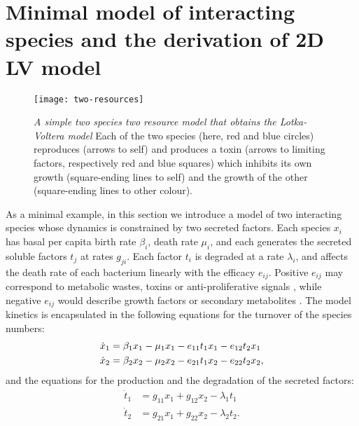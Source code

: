 \section{Minimal model of interacting species and the derivation of 2D LV model} %
\begin{figure}[ht]
	\centering
	\texttt{[image: two-resources]}
	\caption{\emph{A simple two species two resource model that obtains the Lotka-Voltera model} Each of the two species (here, red and blue circles) reproduces (arrows to self) and produces a toxin (arrows to limiting factors, respectively red and blue squares) which inhibits its own growth (square-ending lines to self) and the growth of the other (square-ending lines to other colour). }
\end{figure}%

As a minimal example, in this section we introduce a model of two interacting species whose dynamics is constrained by two secreted factors. Each species $x_i$ has basal per capita birth rate $\beta_i$, death rate $\mu_i$, and each generates the secreted soluble factors $t_j$ at rates $g_{ji}$. Each factor $t_i$ is degraded at a rate $\lambda_i$, and affects the death rate of each bacterium linearly with the efficacy $e_{ij}$. Positive $e_{ij}$ may correspond to metabolic wastes, toxins or anti-proliferative signals \cite{Jacob1989,Maplestone1992,VanMelderen2009,Rankin2012,Shen2015,Wynn2015}, while negative $e_{ij}$ would describe growth factors or secondary metabolites \cite{Maplestone1992,Reya2001,Wink2003}. The model kinetics is encapsulated in the following equations for the turnover of the species numbers:
\begin{align}
\dot{x}_1 &= \beta_1 x_1 - \mu_1 x_1 - e_{11} t_1 x_1 - e_{12} t_2 x_1 \notag \\
\dot{x}_2 &= \beta_2 x_2 - \mu_2 x_2 - e_{21} t_1 x_2 - e_{22} t_2 x_2 \label{eq-x-tox},
\end{align}
and the equations for the production and the degradation of the secreted factors:
\begin{align}
\dot{t}_1 &= g_{11} x_1 + g_{12}x_2 - \lambda_1 t_1  \nonumber \\
\dot{t}_2 &= g_{21} x_1 + g_{22}x_2 - \lambda_2 t_2. \label{eq-tox}
\end{align}

